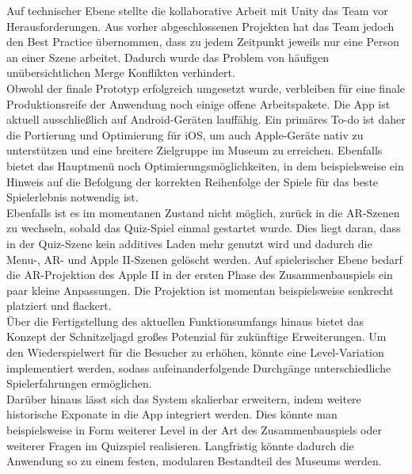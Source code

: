 Auf technischer Ebene stellte die kollaborative Arbeit mit Unity das Team vor Herausforderungen. Aus vorher abgeschlossenen Projekten hat das Team jedoch den Best Practice übernommen, dass zu jedem Zeitpunkt jeweils nur eine Person an einer Szene arbeitet. Dadurch wurde das Problem von häufigen unübersichtlichen Merge Konflikten verhindert.\\

Obwohl der finale Prototyp erfolgreich umgesetzt wurde, verbleiben für eine finale Produktionsreife der Anwendung noch einige offene Arbeitspakete. Die App ist aktuell ausschließlich auf Android-Geräten lauffähig. Ein primäres To-do ist daher die Portierung und Optimierung für iOS, um auch Apple-Geräte nativ zu unterstützen und eine breitere Zielgruppe im Museum zu erreichen. Ebenfalls bietet das Hauptmenü noch Optimierungsmöglichkeiten, in dem beispielsweise ein Hinweis auf die Befolgung der korrekten Reihenfolge der Spiele für das beste Spielerlebnis notwendig ist.\\ 
Ebenfalls ist es im momentanen Zustand nicht möglich, zurück in die AR-Szenen zu wechseln, sobald das Quiz-Spiel einmal gestartet wurde. Dies liegt daran, dass in der Quiz-Szene kein additives Laden mehr genutzt wird und dadurch die Menu-, AR- und Apple II-Szenen gelöscht werden. Auf spielerischer Ebene bedarf die AR-Projektion des Apple II in der ersten Phase des Zusammenbauspiels ein paar kleine Anpassungen. Die Projektion ist momentan beispielsweise senkrecht platziert und flackert.\\ 

Über die Fertigstellung des aktuellen Funktionsumfangs hinaus bietet das Konzept der Schnitzeljagd großes Potenzial für zukünftige Erweiterungen. Um den Wiederspielwert für die Besucher zu erhöhen, könnte eine Level-Variation implementiert werden, sodass aufeinanderfolgende Durchgänge unterschiedliche Spielerfahrungen ermöglichen.\\

Darüber hinaus lässt sich das System skalierbar erweitern, indem weitere historische Exponate in die App integriert werden. Dies könnte man beispielsweise in Form weiterer Level in der Art des Zusammenbauspiels oder weiterer Fragen im Quizspiel realisieren. Langfristig könnte dadurch die Anwendung so zu einem festen, modularen Bestandteil des Museums werden.